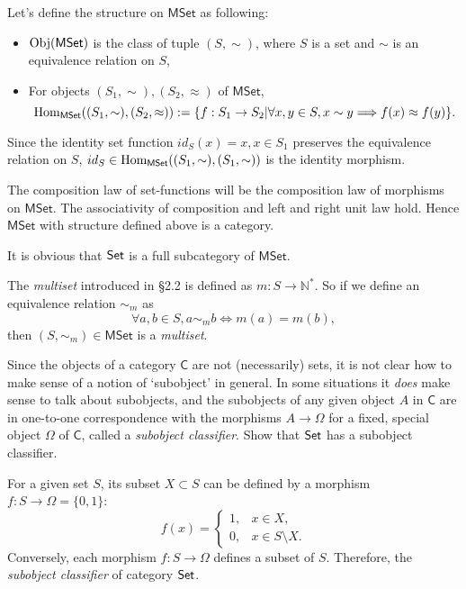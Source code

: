 \begin{solution}
Let's define the structure on $\mathsf{MSet}$ as following:
\begin{itemize}
\item $\mathrm{Obj}(\mathsf{MSet})$ is the class of tuple $(S,\sim)$, where $S$ is a set and $\sim$ is 
an equivalence relation on $S$,
\item For objects $(S_1,\sim), (S_2, \approx)$ of $\mathsf{MSet}$, 
$$\mathrm{Hom}_{\mathsf{MSet}}((S_1,\sim), (S_2, \approx)):=\{f: S_1\to S_2 | \forall x,y\in S, x\sim y\Longrightarrow f(x)\approx f(y)\}.$$
\end{itemize}

Since the identity set function $id_{S}(x)=x, x\in S_1$ preserves the equivalence relation on $S$, $id_S \in \mathrm{Hom}_{\mathsf{MSet}}((S_1,\sim), (S_1, \sim))$ is the identity morphism. 

The composition law of set-functions will be the composition law of morphisms on $\mathsf{MSet}$. 
The associativity of composition and left and right unit law hold. Hence $\mathsf{MSet}$ with structure defined above is a category.

It is obvious that $\mathsf{Set}$ is a full subcategory of $\mathsf{MSet}$. 

The \textit{multiset} introduced in \S2.2 is defined as $m: S\to \mathbb{N}^{\ast}$. So if we define an equivalence relation $\sim_m$ as 
$$\forall a,b\in S, a\sim_m b \iff m(a)=m(b),$$ then $(S, \sim_m)\in \mathsf{MSet}$ is a \textit{multiset}.
\end{solution}

\begin{problem}[3.10]
  Since the objects of a category $\mathsf{C}$ are not (necessarily) sets, it is not clear
  how to make sense of a notion of `subobject' in general. In some situations it
  \textit{does} make sense to talk about subobjects, and the subobjects of any
  given object $A$ in $\mathsf{C}$ are in one-to-one correspondence with the morphisms
  $A\to\Omega$ for a fixed, special object $\Omega$ of $\mathsf{C}$, called a
  \textit{subobject classifier}. Show that $\mathsf{Set}$ has a subobject classifier.
\end{problem}

\begin{solution}
For a given set $S$, its subset $X\subset S$ can be defined by a morphism $f: S\to \Omega=\{0,1\}$:
$$f(x) =\begin{cases}
1, &x\in X,\\
0, &x\in S\setminus X.
\end{cases}$$
Conversely, each morphism $f: S\to \Omega$ defines a subset of $S$.
Therefore, the \textit{subobject classifier} of category $\mathsf{Set}$.  
\end{solution}

